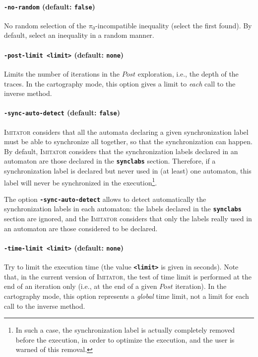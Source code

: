\documentclass[a4paper,10pt]{article}
\newcommand{\imitator}{\textsc{Imitator}}
\newcommand{\code}[1]{\textbf{\texttt{#1}}}
\begin{document}
\paragraph{\code{-no-random} (default: \code{false})}
No random selection of the $\pi_0$-incompatible inequality (select the first found).
By default, select an inequality in a random manner.

\paragraph{\code{-post-limit <limit>} (default: \code{none})}
Limits the number of iterations in the $\mathit{Post}$ exploration, i.e., the depth of the traces.
In the cartography mode, this option gives a limit to \emph{each} call to the inverse method.

\paragraph{\code{-sync-auto-detect} (default: \code{false})}
\imitator{} considers that all the automata declaring a given synchronization label must be able to synchronize all together, so that the synchronization can happen.
By default, \imitator{} considers that the synchronization labels declared in an automaton are those declared in the \code{synclabs} section.
Therefore, if a synchronization label is declared but never used in (at least) one automaton, this label will never be synchronized in the execution\footnote{In such a case, the synchronization label is actually completely removed before the execution, in order to optimize the execution, and the user is warned of this removal.}.

The option \code{-sync-auto-detect} allows to detect automatically the synchronization labels in each automaton: the labels declared in the \code{synclabs} section are ignored, and the \imitator{} considers that only the labels really used in an automaton are those considered to be declared.


\paragraph{\code{-time-limit <limit>} (default: \code{none})}
Try to limit the execution time (the value \code{<limit>} is given in seconds).
Note that, in the current version of \imitator{}, the test of time limit is performed at the end of an iteration only (i.e., at the end of a given $\mathit{Post}$ iteration).
In the cartography mode, this option represents a \emph{global} time limit, not a limit for each call to the inverse method.
\end{document}
